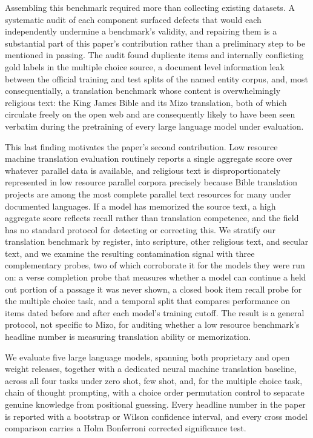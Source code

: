 \documentclass[pdflatex,sn-mathphys-ay]{sn-jnl}
\begin{document}
Assembling this benchmark required more than collecting existing datasets. A systematic audit of each component surfaced defects that would each independently undermine a benchmark's validity, and repairing them is a substantial part of this paper's contribution rather than a preliminary step to be mentioned in passing. The audit found duplicate items and internally conflicting gold labels in the multiple choice source, a document level information leak between the official training and test splits of the named entity corpus, and, most consequentially, a translation benchmark whose content is overwhelmingly religious text: the King James Bible and its Mizo translation, both of which circulate freely on the open web and are consequently likely to have been seen verbatim during the pretraining of every large language model under evaluation.

This last finding motivates the paper's second contribution. Low resource machine translation evaluation routinely reports a single aggregate score over whatever parallel data is available, and religious text is disproportionately represented in low resource parallel corpora precisely because Bible translation projects are among the most complete parallel text resources for many under documented languages. If a model has memorized the source text, a high aggregate score reflects recall rather than translation competence, and the field has no standard protocol for detecting or correcting this. We stratify our translation benchmark by register, into scripture, other religious text, and secular text, and we examine the resulting contamination signal with three complementary probes, two of which corroborate it for the models they were run on: a verse completion probe that measures whether a model can continue a held out portion of a passage it was never shown, a closed book item recall probe for the multiple choice task, and a temporal split that compares performance on items dated before and after each model's training cutoff. The result is a general protocol, not specific to Mizo, for auditing whether a low resource benchmark's headline number is measuring translation ability or memorization.

We evaluate five large language models, spanning both proprietary and open weight releases, together with a dedicated neural machine translation baseline, across all four tasks under zero shot, few shot, and, for the multiple choice task, chain of thought prompting, with a choice order permutation control to separate genuine knowledge from positional guessing. Every headline number in the paper is reported with a bootstrap or Wilson confidence interval, and every cross model comparison carries a Holm Bonferroni corrected significance test.
\end{document}
